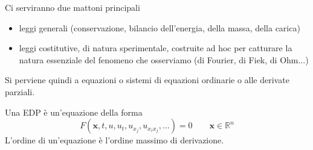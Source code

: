 \documentclass[10pt,a4paper,twoside,openright]{book}
\newcommand{\x}{\mathbf{x}}
\begin{document}
Ci serviranno due mattoni principali
\begin{itemize}
\item leggi generali (conservazione, bilancio dell'energia, della massa, della carica)
\item leggi costitutive, di natura sperimentale, costruite ad hoc per catturare la natura essenziale del fenomeno che osserviamo (di Fourier, di Fiek, di Ohm...)
\end{itemize}

Si perviene quindi a equazioni o sistemi di equazioni ordinarie o alle derivate parziali.

Una EDP è un'equazione della forma
\begin{equation*}
F( \x,t,u,u_{t},u_{x_{j}},u_{x_{i} x_{j}},\dotsc)=0 \qquad \x\in \mathbb{R} ^{n} 
\end{equation*}
L'ordine di un'equazione è l'ordine massimo di derivazione.
\end{document}
